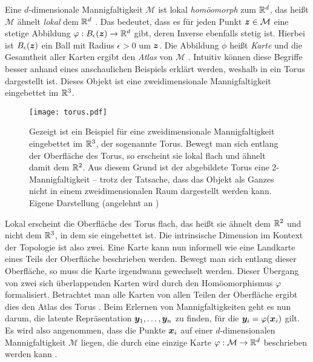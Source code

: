 Eine $d$-dimensionale Mannigfaltigkeit $\mathcal{M}$ ist lokal \textit{homöomorph} zum $\mathbb{R}^d$,
das heißt $\mathcal{M}$ ähnelt \textit{lokal} dem $\mathbb{R}^d$ \parencite[3]{Lee.2011}. Das bedeutet, dass es für jeden Punkt $\bm{z} \in \mathcal{M}$ eine stetige
Abbildung $\varphi: B_\epsilon(\bm{z}) \rightarrow \mathbb{R}^d$ gibt, deren Inverse ebenfalls stetig
ist. Hierbei ist $B_\epsilon(\bm{z})$ ein Ball mit Radius $\epsilon > 0$ um $\bm{z}$. Die
Abbildung $\phi$ heißt \textit{Karte} und die Gesamtheit aller Karten ergibt den \textit{Atlas} von
$\mathcal{M}$ \parencite[4]{Cayton.2005}. Intuitiv können diese Begriffe besser anhand eines anschaulichen Beispiels
erklärt werden, weshalb in  ein Torus dargestellt ist. Dieses Objekt ist eine
zweidimensionale Mannigfaltigkeit eingebettet im $\mathbb{R}^3$.
\begin{figure}[ht]
	\centering
	\texttt{[image: torus.pdf]}
	\caption[Ein Beispiel für eine zweidimensionale Mannigfaltigkeit: ein Torus]{Gezeigt ist ein Beispiel für eine zweidimensionale Mannigfaltigkeit eingebettet im $\mathbb{R}^3$, der sogenannte Torus. Bewegt man sich entlang der Oberfläche des Torus, so erscheint sie lokal flach und ähnelt damit dem $\mathbb{R}^2$. Aus diesem Grund ist der abgebildete Torus eine 2-Mannigfaltigkeit -- trotz der Tatsache, dass das Objekt als Ganzes nicht in einem zweidimensionalen Raum dargestellt werden kann. Eigene Darstellung (angelehnt an \textcite[350]{Hill.2020})}
	\label{fig:Torus}
\end{figure}
Lokal erscheint die Oberfläche des Torus flach, das heißt sie ähnelt dem $\mathbb{R}^2$ und nicht dem $\mathbb{R}^3$, in dem sie eingebettet ist. Die intrinsische Dimension im Kontext der Topologie ist also zwei. Eine Karte kann nun informell wie eine Landkarte eines Teils der Oberfläche beschrieben werden. Bewegt man sich entlang
dieser Oberfläche, so muss die Karte irgendwann gewechselt werden. Dieser Übergang von zwei sich
überlappenden Karten wird durch den Homöomorphismus $\varphi$ formalisiert. Betrachtet man alle Karten
von allen Teilen der Oberfläche ergibt dies den Atlas des Torus \parencite[4, 12]{Lee.2012}. Beim Erlernen von Mannigfaltigkeiten geht es nun darum, die latente
Repräsentation $\bm{y}_1, \ldots, \bm{y}_n$ zu finden, für die $\bm{y}_i =
	\varphi(\bm{x}_i)$ gilt. Es wird also angenommen, dass die Punkte $\bm{x}_i$ auf einer
$d$-dimensionalen Mannigfaltigkeit $\mathcal{M}$ liegen, die durch eine einzige Karte $\varphi:
	\mathcal{M} \rightarrow \mathbb{R}^d$ beschrieben werden kann \parencite[4]{Cayton.2005}.

